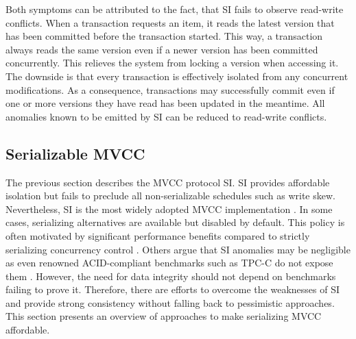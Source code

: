 
Both symptoms can be attributed to the fact, that \ac{SI} fails to observe
read-write conflicts. When a transaction requests an item, it reads the latest
version that has been committed before the transaction started. This way, a
transaction always reads the same version even if a newer version has been
committed concurrently. This relieves the system from locking a version when
accessing it. The downside is that every transaction is effectively isolated
from any concurrent modifications. As a consequence, transactions may
successfully commit even if one or more versions they have read has been updated
in the meantime. All anomalies known to be emitted by \ac{SI} can be reduced to
read-write conflicts.

\subsection{Serializable MVCC}

The previous section describes the \ac{MVCC} protocol \ac{SI}. \ac{SI} provides
affordable isolation but fails to preclude all non-serializable schedules such
as write skew. Nevertheless, \ac{SI} is the most widely adopted \ac{MVCC}
implementation \cite{larson2011high, bailey2013exploring, neumann2015fast}. In
some cases, serializing alternatives are available but disabled by default. This
policy is often motivated by significant performance benefits compared to
strictly serializing concurrency control \cite{cahill2009serializable}. Others
argue that \ac{SI} anomalies may be negligible as even renowned ACID-compliant
benchmarks such as TPC-C do not expose them \cite{fekete2005making}. However,
the need for data integrity should not depend on benchmarks failing to prove
it. Therefore, there are efforts to overcome the weaknesses of \ac{SI} and
provide strong consistency without falling back to pessimistic approaches. This
section presents an overview of approaches to make serializing \ac{MVCC}
affordable.

